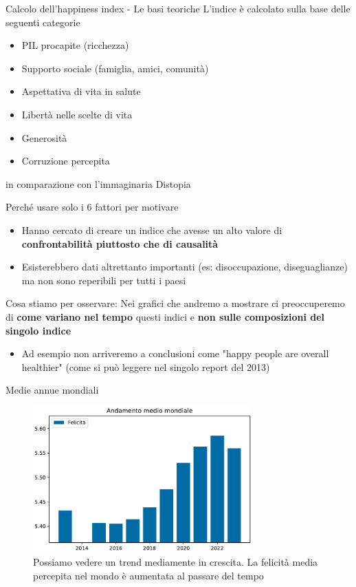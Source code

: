 \documentclass{beamer}
\begin{document}
\begin{frame}{Calcolo dell'happiness index - Le basi teoriche}
	L'indice è calcolato sulla base delle seguenti categorie
	\begin{itemize}
		\item PIL procapite (ricchezza)
		\item Supporto sociale (famiglia, amici, comunità)
		\item Aspettativa di vita in salute
		\item Libertà nelle scelte di vita
		\item Generosità
		\item Corruzione percepita
	\end{itemize}
	in comparazione con l'immaginaria Distopia
\end{frame}

\begin{frame}{Perché usare solo i 6 fattori per motivare}
	\begin{itemize}
		\item Hanno cercato di creare un indice che avesse un alto valore di \textbf{confrontabilità piuttosto che di causalità}
		\item Esisterebbero dati altrettanto importanti (es: disoccupazione, diseguaglianze) ma non sono reperibili per tutti i paesi
	\end{itemize}
\end{frame}

\begin{frame}{Cosa stiamo per osservare: }
	Nei grafici che andremo a mostrare ci preoccuperemo di \textbf{come variano nel tempo} questi indici e \textbf{non sulle composizioni del singolo indice}
	\begin{itemize}
		\item Ad esempio non arriveremo a conclusioni come "happy people are overall healthier" (come si può leggere nel singolo report del 2013)
	\end{itemize}
\end{frame}

\begin{frame}{Medie annue mondiali}
	\begin{figure}
		\centering
		\includegraphics[width=0.75\textwidth]{"./img/1medieAnnue.pdf"}
		\caption{Possiamo vedere un trend mediamente in crescita. La felicità media percepita nel mondo è aumentata al passare del tempo}
		\label{fig:pdf}
	\end{figure}
\end{frame}
\end{document}
